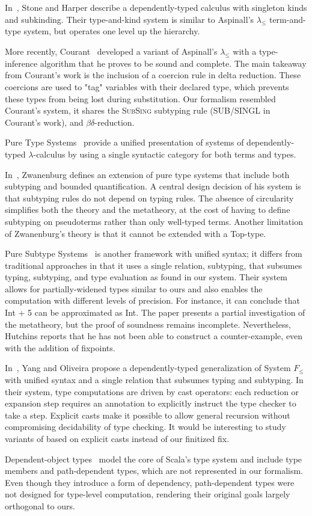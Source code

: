 In~\citep{stone2000deciding}, Stone and Harper describe a dependently-typed calculus with singleton kinds and subkinding.
Their type-and-kind system is similar to Aspinall's ${\lambda}_{\leq}{}$ term-and-type system, but operates one level up the hierarchy.

More recently, Courant~\citep{courant2003strong} developed a variant of Aspinall's ${\lambda}_{\leq}{}$ with a type-inference algorithm that he proves to be sound and complete.
The main takeaway from Courant's work is the inclusion of a coercion rule in delta reduction.
These coercions are used to "tag" variables with their declared type, which prevents these types from being lost during substitution.
Our formalism resembled Courant's system, it shares the \textsc{SubSing} subtyping rule (SUB/SINGL in Courant's work), and $\beta\delta$-reduction.

Pure Type Systems~\citep{barendregt1991introduction} provide a unified presentation of systems of dependently-typed $\lambda$-calculus by using a single syntactic category for both terms and types.

In~\citep{zwanenburg1999pure}, Zwanenburg defines an extension of pure type systems that include both subtyping and bounded quantification.
A central design decision of his system is that subtyping rules do not depend on typing rules.
The absence of circularity simplifies both the theory and the metatheory, at the cost of having to define subtyping on pseudoterms rather than only well-typed terms.
Another limitation of Zwanenburg's theory is that it cannot be extended with a Top-type.

Pure Subtype Systems~\citep{hutchins2010pure} is another framework with unified syntax; it differs from traditional approaches in that it uses a single relation, subtyping, that subsumes typing, subtyping, and type evaluation as found in our system.
Their system allows for partially-widened types similar to ours and also enables the computation with different levels of precision.
For instance, it can conclude that Int + 5 can be approximated as Int.
The paper presents a partial investigation of the metatheory, but the proof of soundness remains incomplete.
Nevertheless, Hutchins reports that he has not been able to construct a counter-example, even with the addition of fixpoints.

In~\citep{yang2017unifying}, Yang and Oliveira propose a dependently-typed generalization of System $F_{\leq}$ with unified syntax and a single relation that subsumes typing and subtyping.
In their system, type computations are driven by cast operators: each reduction or expansion step requires an annotation to explicitly instruct the type checker to take a step.
Explicit casts make it possible to allow general recursion without compromising decidability of type checking.
It would be interesting to study variants of \oursystem based on explicit casts instead of our finitized fix.

Dependent-object types~\citep{amin2017type} model the core of Scala's type system and include type members and path-dependent types, which are not represented in our formalism.
Even though they introduce a form of dependency, path-dependent types were not designed for type-level computation, rendering their original goals largely orthogonal to ours.
